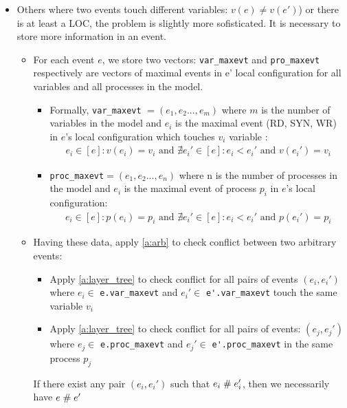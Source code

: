 \documentclass{llncs}
\begin{document}
\begin{enumerate}
\begin{itemize}
		\item Others where two events touch different variables: $v(e) \neq v(e')$) or there is at least a LOC, the problem is slightly more sofisticated. It is necessary to store more information in an event.	
		\begin{itemize}
			\item 
			For each event $e$, we store two vectors: \verb!var_maxevt! and \verb!pro_maxevt! respectively are vectors of maximal events in e' local configuration for all variables and all processes in the model.
			\begin{itemize}
				\item
				Formally, \verb!var_maxevt! $ = (e_1, e_2...,e_m)$ where $m$ is the number of variables in 
				the model and $e_i$ is the maximal event (RD, SYN, WR) in $e$'s local configuration which 
				touches $v_i$ variable :
				\begin{align}
				e_i \in  \left[ e \right]: v(e_i) = v_i \text{ and }  \nexists e_i' \in \left[ e \right] :
				e_i < e_i' \text{ and } v(e_i') = v_i \nonumber
				\end{align}
				
				\item
				\verb!proc_maxevt!$ = (e_1, e_2...,e_n)$ where  n is the number of processes in the
				model and $e_i$ is the maximal event of process $p_i$ in $e$'s local configuration:
				\begin{align}
				e_i \in  \left[ e \right]: p(e_i) = p_i \text{ and } 
				\nexists e_i' \in \left[ e \right]:
				e_i < e_i' \text{ and } p(e_i') = p_i \nonumber 
				\end{align}
				
			\end{itemize}				
			\item
			Having these data, apply \cref{a:arb} to check conflict between two arbitrary events:
			\begin{itemize}
				\item
				Apply \cref{a:layer_tree} to check conflict for all pairs of events $(e_i, e_i')$ where $e_i \in $ \verb!e.var_maxevt! 	
				and $e_i'\in $ \verb!e'.var_maxevt! touch the same variable $v_i$
				\item
				Apply \cref{a:layer_tree} to check conflict for all pairs of events: $(e_j, e_j')$ where $e_j \in $ \verb!e.proc_maxevt! 	
				and $e_j'\in $ \verb!e'.proc_maxevt! in the same process $p_j$
			\end{itemize}
			
			If there exist any pair $(e_i, e_i')$ such that $e_i \mathrel{\#} e_i'$, then we necessarily have $e \mathrel{\#} e'$			
		\end{itemize}	
	\end{itemize}
\end{enumerate}
\end{document}
